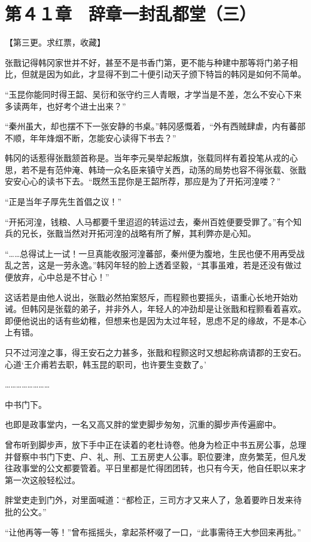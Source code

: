 \section{第４１章　辞章一封乱都堂（三）}

【第三更。求红票，收藏】

张戬记得韩冈家世并不好，甚至不是书香门第，更不能与种建中那等将门弟子相比，但就是因为如此，才显得不到二十便引动天子颁下特旨的韩冈是如何不简单。

“玉昆你能同时得王韶、吴衍和张守约三人青眼，才学当是不差，怎么不安心下来多读两年，也好考个进士出来？”

“秦州虽大，却也摆不下一张安静的书桌。”韩冈感慨着，“外有西贼肆虐，内有蕃部不顺，年年烽烟不断，怎能安心读得下书去？”

韩冈的话惹得张戬颔首称是。当年李元昊举起叛旗，张载同样有着投笔从戎的心思，若不是有范仲淹、韩琦一众名臣来镇守关西，动荡的局势也容不得张载、张戬安安心心的读书下去。“既然玉昆你是王韶所荐，那应是为了开拓河湟喽？”

“正是当年子厚先生首倡之议！”

“开拓河湟，钱粮、人马都要千里迢迢的转运过去，秦州百姓便要受罪了。”有个知兵的兄长，张戬当然对开拓河湟的战略有所了解，其利弊亦是心知。

“……总得试上一试！一旦真能收服河湟蕃部，秦州便为腹地，生民也便不用再受战乱之苦，这是一劳永逸。”韩冈年轻的脸上透着坚毅，“其事虽难，若是还没有做过便放弃，心中总是不甘心！”

这话若是由他人说出，张戬必然拍案怒斥，而程颢也要摇头，语重心长地开始劝诫。但韩冈是张载的弟子，并非外人，年轻人的冲劲却是让张戬和程颢看着喜欢。即便他说出的话有些幼稚，但想来也是因为太过年轻，思虑不足的缘故，不是本心上有错。

只不过河湟之事，得王安石之力甚多，张戬和程颢这时又想起称病请郡的王安石。心道‘王介甫若去职，韩玉昆的职司，也许要生变数了。’

……………………

中书门下。

也即是政事堂内，一名又高又胖的堂吏脚步匆匆，沉重的脚步声传遍廊中。

曾布听到脚步声，放下手中正在读着的老杜诗卷。他身为检正中书五房公事，总理并督察中书门下吏、户、礼、刑、工五房吏人公事。职位要津，庶务繁芜，但凡发往政事堂的公文都要管着。平日里都是忙得团团转，也只有今天，他自任职以来才第一次这般轻松过。

胖堂吏走到门外，对里面喊道：“都检正，三司方才又来人了，急着要昨日发来待批的公文。”

“让他再等一等！”曾布摇摇头，拿起茶杯啜了一口，“此事需待王大参回来再批。”

